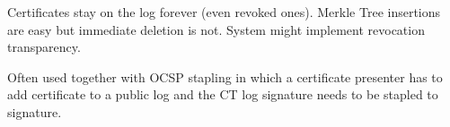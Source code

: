 Certificates stay on the log forever (even revoked ones). Merkle Tree insertions are easy but immediate deletion is not. System might implement revocation transparency.

Often used together with OCSP stapling in which a certificate presenter has to add certificate to a public log and the CT log signature needs to be stapled to signature.






